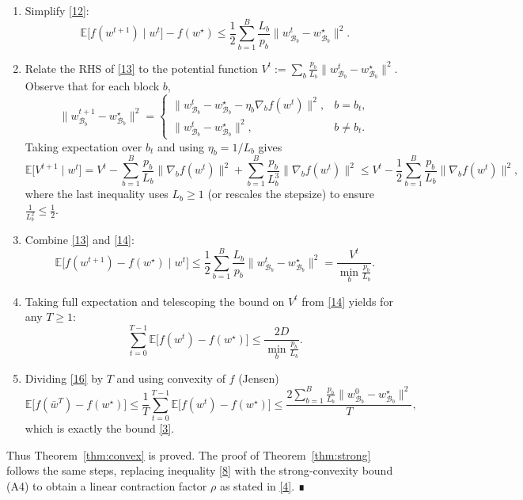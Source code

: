 \documentclass[11pt]{article}
\newcommand{\E}{\mathbb{E}}
\begin{document}
\begin{enumerate}[label=[Step \arabic*],leftmargin=*]
\item Simplify \eqref{12}:
\[
\E\!\bigl[f(w^{t+1})\mid w^{t}\bigr]-f(w^{\star})
\le
\frac12\sum_{b=1}^{B}\frac{L_{b}}{p_{b}}
\|w^{t}_{\mathcal{B}_{b}}-w^{\star}_{\mathcal{B}_{b}}\|^{2}.
\tag{13}
\]

\item Relate the RHS of \eqref{13} to the potential function
$V^{t}:=\sum_{b}\frac{p_{b}}{L_{b}}
\|w^{t}_{\mathcal{B}_{b}}-w^{\star}_{\mathcal{B}_{b}}\|^{2}$.
Observe that for each block $b$,
\[
\|w^{t+1}_{\mathcal{B}_{b}}-w^{\star}_{\mathcal{B}_{b}}\|^{2}
=
\begin{cases}
\|w^{t}_{\mathcal{B}_{b}}-w^{\star}_{\mathcal{B}_{b}}
-\eta_{b}\nabla_{b}f(w^{t})\|^{2},
& b=b_{t},\\[4pt]
\|w^{t}_{\mathcal{B}_{b}}-w^{\star}_{\mathcal{B}_{b}}\|^{2},
& b\neq b_{t}.
\end{cases}
\]
Taking expectation over $b_{t}$ and using $\eta_{b}=1/L_{b}$ gives
\[
\E\!\bigl[V^{t+1}\mid w^{t}\bigr]
=V^{t}-\sum_{b=1}^{B}\frac{p_{b}}{L_{b}}
\|\nabla_{b}f(w^{t})\|^{2}
+\sum_{b=1}^{B}\frac{p_{b}}{L_{b}^{3}}
\|\nabla_{b}f(w^{t})\|^{2}
\le V^{t}-\frac12\sum_{b=1}^{B}\frac{p_{b}}{L_{b}}
\|\nabla_{b}f(w^{t})\|^{2},
\tag{14}
\]
where the last inequality uses $L_{b}\ge1$ (or rescales the stepsize) to
ensure $\frac{1}{L_{b}^{2}}\le\frac12$.

\item Combine \eqref{13} and \eqref{14}:
\[
\E\!\bigl[f(w^{t+1})-f(w^{\star})\mid w^{t}\bigr]
\le \frac12\sum_{b=1}^{B}\frac{L_{b}}{p_{b}}
\|w^{t}_{\mathcal{B}_{b}}-w^{\star}_{\mathcal{B}_{b}}\|^{2}
= \frac{V^{t}}{\min_{b}\frac{p_{b}}{L_{b}}}.
\tag{15}
\]

\item Taking full expectation and telescoping the bound on $V^{t}$
from \eqref{14} yields for any $T\ge1$:
\[
\sum_{t=0}^{T-1}\E\!\bigl[f(w^{t})-f(w^{\star})\bigr]
\le
\frac{2D}{\displaystyle\min_{b}\frac{p_{b}}{L_{b}}}.
\tag{16}
\]

\item Dividing \eqref{16} by $T$ and using convexity of $f$ (Jensen)
\[
\E\!\bigl[f(\bar w^{T})-f(w^{\star})\bigr]
\le\frac{1}{T}\sum_{t=0}^{T-1}\E\!\bigl[f(w^{t})-f(w^{\star})\bigr]
\le
\frac{2\displaystyle\sum_{b=1}^{B}\frac{p_{b}}{L_{b}}
\|w^{0}_{\mathcal{B}_{b}}-w^{\star}_{\mathcal{B}_{b}}\|^{2}}{T},
\tag{17}
\]
which is exactly the bound \eqref{3}.
\end{enumerate}
Thus Theorem~\ref{thm:convex} is proved.  The proof of
Theorem~\ref{thm:strong} follows the same steps, replacing inequality
\eqref{8} with the strong‑convexity bound (A4) to obtain a linear
contraction factor $\rho$ as stated in \eqref{4}.  ∎
\end{document}
